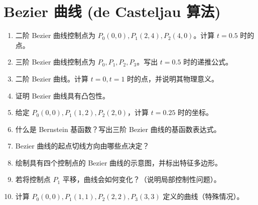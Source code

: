 \documentclass[UTF8]{ctexart}
\begin{document}
\section{Bezier 曲线 (de Casteljau 算法)}
\begin{enumerate}
    \item 二阶 Bezier 曲线控制点为 $P_0(0,0), P_1(2,4), P_2(4,0)$。计算 $t=0.5$ 时的点。
    \item 三阶 Bezier 曲线控制点为 $P_0, P_1, P_2, P_3$。写出 $t=0.5$ 时的递推公式。
    \item 二阶 Bezier 曲线。计算 $t=0, t=1$ 时的点，并说明其物理意义。
    \item 证明 Bezier 曲线具有凸包性。
    \item 给定 $P_0(0,0), P_1(1,2), P_2(2,0)$，计算 $t=0.25$ 时的坐标。
    \item 什么是 Bernstein 基函数？写出三阶 Bezier 曲线的基函数表达式。
    \item Bezier 曲线的起点切线方向由哪些点决定？
    \item 绘制具有四个控制点的 Bezier 曲线的示意图，并标出特征多边形。
    \item 若将控制点 $P_1$ 平移，曲线会如何变化？（说明局部控制性问题）。
    \item 计算 $P_0(0,0), P_1(1,1), P_2(2,2), P_3(3,3)$ 定义的曲线（特殊情况）。
\end{enumerate}
\end{document}
